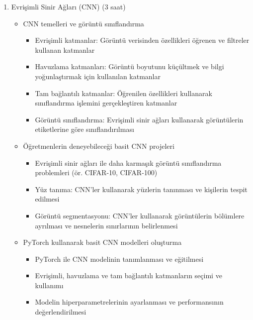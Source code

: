 \documentclass[12pt]{article}
\begin{document}
\begin{enumerate}
    
    \item Evrişimli Sinir Ağları (CNN) (3 saat)
    \begin{itemize}
        \item CNN temelleri ve görüntü sınıflandırma
        \begin{itemize}
            \item Evrişimli katmanlar: Görüntü verisinden özellikleri öğrenen ve filtreler kullanan katmanlar
            \item Havuzlama katmanları: Görüntü boyutunu küçültmek ve bilgi yoğunlaştırmak için kullanılan katmanlar
            \item Tam bağlantılı katmanlar: Öğrenilen özellikleri kullanarak sınıflandırma işlemini gerçekleştiren katmanlar
            \item Görüntü sınıflandırma: Evrişimli sinir ağları kullanarak görüntülerin etiketlerine göre sınıflandırılması
        \end{itemize}
        \item Öğretmenlerin deneyebileceği basit CNN projeleri
        \begin{itemize}
            \item Evrişimli sinir ağları ile daha karmaşık görüntü sınıflandırma problemleri (ör. CIFAR-10, CIFAR-100)
            \item Yüz tanıma: CNN'ler kullanarak yüzlerin tanınması ve kişilerin tespit edilmesi
            \item Görüntü segmentasyonu: CNN'ler kullanarak görüntülerin bölümlere ayrılması ve nesnelerin sınırlarının belirlenmesi
        \end{itemize}
        \item PyTorch kullanarak basit CNN modelleri oluşturma
        \begin{itemize}
            \item PyTorch ile CNN modelinin tanımlanması ve eğitilmesi
            \item Evrişimli, havuzlama ve tam bağlantılı katmanların seçimi ve kullanımı
            \item Modelin hiperparametrelerinin ayarlanması ve performansının değerlendirilmesi
        \end{itemize}
    \end{itemize}


\end{enumerate}
\end{document}
